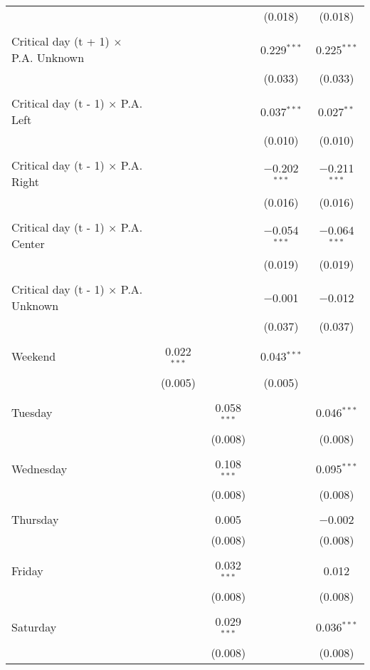 \documentclass[
]{article}
\begin{document}
\begin{table}[!htbp]
{\begin{tabular}{@{\extracolsep{5pt}}lcccc}
  &  &  & (0.018) & (0.018) \\ 
  & & & & \\ 
 Critical day (t + 1) $\times$ P.A. Unknown &  &  & 0.229$^{***}$ & 0.225$^{***}$ \\ 
  &  &  & (0.033) & (0.033) \\ 
  & & & & \\ 
 Critical day (t - 1) $\times$ P.A. Left &  &  & 0.037$^{***}$ & 0.027$^{**}$ \\ 
  &  &  & (0.010) & (0.010) \\ 
  & & & & \\ 
 Critical day (t - 1) $\times$ P.A. Right &  &  & $-$0.202$^{***}$ & $-$0.211$^{***}$ \\ 
  &  &  & (0.016) & (0.016) \\ 
  & & & & \\ 
 Critical day (t - 1) $\times$ P.A. Center &  &  & $-$0.054$^{***}$ & $-$0.064$^{***}$ \\ 
  &  &  & (0.019) & (0.019) \\ 
  & & & & \\ 
 Critical day (t - 1) $\times$ P.A. Unknown &  &  & $-$0.001 & $-$0.012 \\ 
  &  &  & (0.037) & (0.037) \\ 
  & & & & \\ 
 Weekend & 0.022$^{***}$ &  & 0.043$^{***}$ &  \\ 
  & (0.005) &  & (0.005) &  \\ 
  & & & & \\ 
 Tuesday &  & 0.058$^{***}$ &  & 0.046$^{***}$ \\ 
  &  & (0.008) &  & (0.008) \\ 
  & & & & \\ 
 Wednesday &  & 0.108$^{***}$ &  & 0.095$^{***}$ \\ 
  &  & (0.008) &  & (0.008) \\ 
  & & & & \\ 
 Thursday &  & 0.005 &  & $-$0.002 \\ 
  &  & (0.008) &  & (0.008) \\ 
  & & & & \\ 
 Friday &  & 0.032$^{***}$ &  & 0.012 \\ 
  &  & (0.008) &  & (0.008) \\ 
  & & & & \\ 
 Saturday &  & 0.029$^{***}$ &  & 0.036$^{***}$ \\ 
  &  & (0.008) &  & (0.008) \\ 

\end{tabular}}
\end{table}
\end{document}
